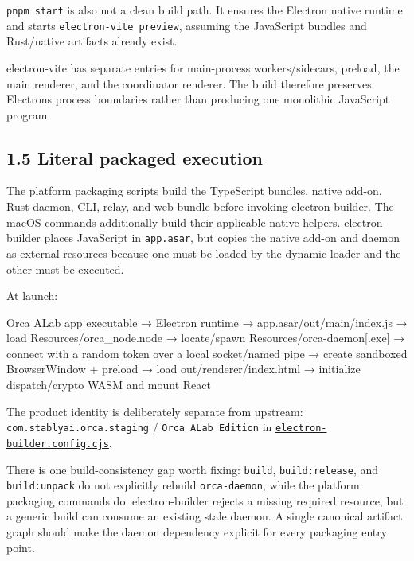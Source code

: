 \documentclass[
  10pt,
  letterpaper,
]{article}
\newenvironment{Shaded}{\begin{snugshade}}{\end{snugshade}}
\newcommand{\NormalTok}[1]{#1}
\begin{document}
\texttt{pnpm\ start} is also not a clean build path. It ensures the
Electron native runtime and starts \texttt{electron-vite\ preview},
assuming the JavaScript bundles and Rust/native artifacts already exist.

electron-vite has separate entries for main-process workers/sidecars,
preload, the main renderer, and the coordinator renderer. The build
therefore preserves Electron\textquotesingle s process boundaries rather
than producing one monolithic JavaScript program.

\subsection{1.5 Literal packaged
execution}\label{15-literal-packaged-execution}

The platform packaging scripts build the TypeScript bundles, native
add-on, Rust daemon, CLI, relay, and web bundle before invoking
electron-builder. The macOS commands additionally build their applicable
native helpers. electron-builder places JavaScript in \texttt{app.asar},
but copies the native add-on and daemon as external resources because
one must be loaded by the dynamic loader and the other must be executed.

At launch:

\begin{Shaded}
\begin{Highlighting}[]
\NormalTok{Orca ALab app executable}
\NormalTok{  → Electron runtime}
\NormalTok{  → app.asar/out/main/index.js}
\NormalTok{  → load Resources/orca\_node.node}
\NormalTok{  → locate/spawn Resources/orca{-}daemon[.exe]}
\NormalTok{  → connect with a random token over a local socket/named pipe}
\NormalTok{  → create sandboxed BrowserWindow + preload}
\NormalTok{  → load out/renderer/index.html}
\NormalTok{  → initialize dispatch/crypto WASM and mount React}
\end{Highlighting}
\end{Shaded}

The product identity is deliberately separate from upstream:
\texttt{com.stablyai.orca.staging} / \texttt{Orca\ ALab\ Edition} in
\href{https://github.com/andrewyatesai/orca-alab/blob/d3ba1bcb17324714a838b2970e04fcd96989e84f/config/electron-builder.config.cjs\#L19}{\texttt{electron-builder.config.cjs}}.

There is one build-consistency gap worth fixing: \texttt{build},
\texttt{build:release}, and \texttt{build:unpack} do not explicitly
rebuild \texttt{orca-daemon}, while the platform packaging commands do.
electron-builder rejects a missing required resource, but a generic
build can consume an existing stale daemon. A single canonical artifact
graph should make the daemon dependency explicit for every packaging
entry point.
\end{document}
